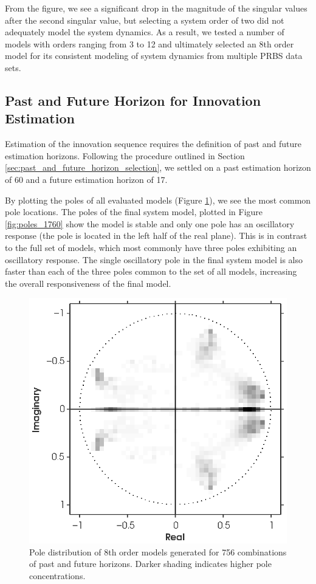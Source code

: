 From the figure, we see a significant drop in the magnitude of the singular values after the second singular value, but selecting a system order of two did not adequately model the system dynamics. As a result, we tested a number of models with orders ranging from 3 to 12 and ultimately selected an 8th order model for its consistent modeling of system dynamics from multiple PRBS data sets.

\subsection{Past and Future Horizon for Innovation Estimation}
Estimation of the innovation sequence requires the definition of past and future estimation horizons. Following the procedure outlined in Section \ref{sec:past_and_future_horizon_selection}, we settled on a past estimation horizon of 60 and a future estimation horizon of 17. 

By plotting the poles of all evaluated models (Figure \ref{fig:poles_all}), we see the most common pole locations. The poles of the final system model, plotted in Figure \ref{fig:poles_1760} show the model is stable and only one pole has an oscillatory response (the pole is located in the left half of the real plane). This is in contrast to the full set of models, which most commonly have three poles exhibiting an oscillatory response. The single oscillatory pole in the final system model is also faster than each of the three poles common to the set of all models, increasing the overall responsiveness of the final model. 

\begin{figure}[htb!]
	\centering
	\includegraphics{../fig/poles_all.eps}
	\caption{Pole distribution of 8th order models generated for 756 combinations of past and future horizons. Darker shading indicates higher pole concentrations.}
	\label{fig:poles_all}
\end{figure}

